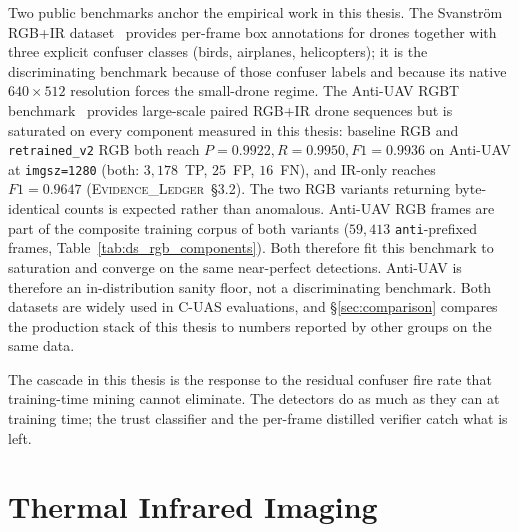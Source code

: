 \documentclass[12pt,a4paper,oneside,openright]{book}
\begin{document}
Two public benchmarks anchor the empirical work in this thesis. The Svanstr\"om RGB+IR dataset~\cite{svanstrom2021real,svanstrom2022dronedataset} provides per-frame box annotations for drones together with three explicit confuser classes (birds, airplanes, helicopters); it is the discriminating benchmark because of those confuser labels and because its native $640\times512$ resolution forces the small-drone regime. The Anti-UAV RGBT benchmark~\cite{jiang2021antiuav,zhao2023antiuav} provides large-scale paired RGB+IR drone sequences but is saturated on every component measured in this thesis: baseline RGB and \texttt{retrained\_v2} RGB both reach $P=0.9922, R=0.9950, F1=0.9936$ on Anti-UAV at \texttt{imgsz=1280} (both: $3{,}178$~TP, $25$~FP, $16$~FN), and IR-only reaches $F1=0.9647$ (\textsc{Evidence\_Ledger}~\S3.2). The two RGB variants returning byte-identical counts is expected rather than anomalous. Anti-UAV RGB frames are part of the composite training corpus of both variants ($59{,}413$ \texttt{anti}-prefixed frames, Table~\ref{tab:ds_rgb_components}). Both therefore fit this benchmark to saturation and converge on the same near-perfect detections. Anti-UAV is therefore an in-distribution sanity floor, not a discriminating benchmark. Both datasets are widely used in C-UAS evaluations, and \S\ref{sec:comparison} compares the production stack of this thesis to numbers reported by other groups on the same data.

The cascade in this thesis is the response to the residual confuser fire rate that training-time mining cannot eliminate. The detectors do as much as they can at training time; the trust classifier and the per-frame distilled verifier catch what is left.

\section{Thermal Infrared Imaging}
\label{sec:lit_ir}
\end{document}
